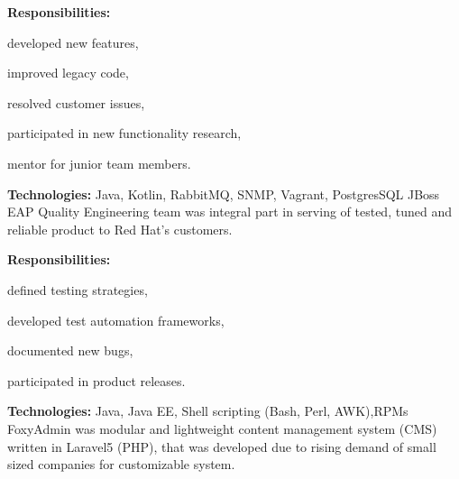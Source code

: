 \documentclass[a4paper]{deedy-resume}
\begin{document}
\vspace{\topsep}
\textbf{Responsibilities:}
\begin{tightitemize}
    \item developed new features,
    \item improved legacy code,
    \item resolved customer issues,
    \item participated in new functionality research,
    \item mentor for junior team members.
\end{tightitemize}
\vspace{\topsep}
\footnotesize\textbf{Technologies:} Java, Kotlin, RabbitMQ, SNMP, Vagrant, PostgresSQL
\normalsize
\sectionspace
\newline
\vspace{\topsep}
JBoss EAP Quality Engineering team was integral part in serving of tested, tuned and reliable product to Red Hat's customers.

\vspace{\topsep}
\textbf{Responsibilities:}
\begin{tightitemize}
    \item defined testing strategies,
    \item developed test automation frameworks,
    \item documented new bugs,
    \item participated in product releases.
\end{tightitemize}

\vspace{\topsep}
\footnotesize\textbf{Technologies:} Java, Java EE, Shell scripting (Bash, Perl, AWK),RPMs
\normalsize
\sectionspace
\newline
\vspace{\topsep}
FoxyAdmin was modular and lightweight content management system (CMS) written in Laravel5 (PHP), that was developed due to rising demand of small sized companies for customizable system.
\end{document}
